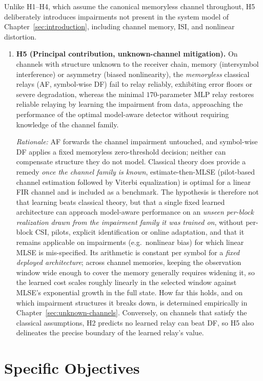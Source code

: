 Unlike H1--H4, which assume the canonical memoryless channel throughout, H5 deliberately introduces impairments not present in the system model of Chapter~\ref{sec:introduction}, including channel memory, ISI, and nonlinear distortion.
\begin{enumerate}[start=5]
\item \textbf{H5 (Principal contribution, unknown-channel mitigation).} On channels with structure unknown to the receiver chain, memory (intersymbol interference) or asymmetry (biased nonlinearity), the \emph{memoryless} classical relays (AF, symbol-wise DF) fail to relay reliably, exhibiting error floors or severe degradation, whereas the minimal $170$-parameter MLP relay restores reliable relaying by learning the impairment from data, approaching the performance of the optimal model-aware detector without requiring knowledge of the channel family.

\emph{Rationale:} AF forwards the channel impairment untouched, and symbol-wise DF applies a fixed memoryless zero-threshold decision; neither can compensate structure they do not model. Classical theory does provide a remedy \emph{once the channel family is known}, estimate-then-MLSE (pilot-based channel estimation followed by Viterbi equalization) is optimal for a linear FIR channel and is included as a benchmark. The hypothesis is therefore not that learning beats classical theory, but that a single fixed learned architecture can approach model-aware performance on an \emph{unseen per-block realization drawn from the impairment family it was trained on}, without per-block CSI, pilots, explicit identification or online adaptation, and that it remains applicable on impairments (e.g.\ nonlinear bias) for which linear MLSE is mis-specified. Its arithmetic is constant per symbol for a \emph{fixed deployed architecture}; across channel memories, keeping the observation window wide enough to cover the memory generally requires widening it, so the learned cost scales roughly linearly in the selected window against MLSE's exponential growth in the full state. How far this holds, and on which impairment structures it breaks down, is determined empirically in Chapter~\ref{sec:unknown-channels}. Conversely, on channels that satisfy the classical assumptions, H2 predicts no learned relay can beat DF, so H5 also delineates the precise boundary of the learned relay's value.
\end{enumerate}

\section{Specific Objectives}\label{sec:specific-objectives}


